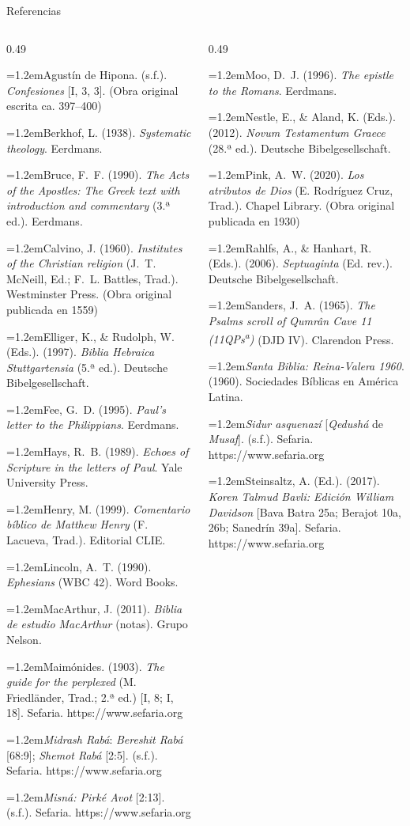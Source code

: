 \documentclass[hyperref={bookmarks=false},aspectratio=169]{beamer}
\newcommand{\refapa}[1]{\par{\RaggedRight\hangindent=1.2em\hangafter=1\noindent #1\par}\vspace{3pt}}
\begin{document}
\begin{frame}{Referencias}
\fontsize{5.1}{6.1}\selectfont
\begin{columns}[t,onlytextwidth]
\begin{column}{0.49\textwidth}
\refapa{Agustín de Hipona. (s.f.). \emph{Confesiones} [I, 3, 3]. (Obra original escrita ca. 397--400)}
\refapa{Berkhof, L. (1938). \emph{Systematic theology}. Eerdmans.}
\refapa{Bruce, F.~F. (1990). \emph{The Acts of the Apostles: The Greek text with introduction and commentary} (3.ª ed.). Eerdmans.}
\refapa{Calvino, J. (1960). \emph{Institutes of the Christian religion} (J.~T. McNeill, Ed.; F.~L. Battles, Trad.). Westminster Press. (Obra original publicada en 1559)}
\refapa{Elliger, K., \& Rudolph, W. (Eds.). (1997). \emph{Biblia Hebraica Stuttgartensia} (5.ª ed.). Deutsche Bibelgesellschaft.}
\refapa{Fee, G.~D. (1995). \emph{Paul's letter to the Philippians}. Eerdmans.}
\refapa{Hays, R.~B. (1989). \emph{Echoes of Scripture in the letters of Paul}. Yale University Press.}
\refapa{Henry, M. (1999). \emph{Comentario bíblico de Matthew Henry} (F. Lacueva, Trad.). Editorial CLIE.}
\refapa{Lincoln, A.~T. (1990). \emph{Ephesians} (WBC 42). Word Books.}
\refapa{MacArthur, J. (2011). \emph{Biblia de estudio MacArthur} (notas). Grupo Nelson.}
\refapa{Maimónides. (1903). \emph{The guide for the perplexed} (M. Friedländer, Trad.; 2.ª ed.) [I, 8; I, 18]. Sefaria. https://www.sefaria.org}
\refapa{\emph{Midrash Rabá}: \emph{Bereshit Rabá} [68:9]; \emph{Shemot Rabá} [2:5]. (s.f.). Sefaria. https://www.sefaria.org}
\refapa{\emph{Misná: Pirké Avot} [2:13]. (s.f.). Sefaria. https://www.sefaria.org}
\end{column}
\begin{column}{0.49\textwidth}
\refapa{Moo, D.~J. (1996). \emph{The epistle to the Romans}. Eerdmans.}
\refapa{Nestle, E., \& Aland, K. (Eds.). (2012). \emph{Novum Testamentum Graece} (28.ª ed.). Deutsche Bibelgesellschaft.}
\refapa{Pink, A.~W. (2020). \emph{Los atributos de Dios} (E. Rodríguez Cruz, Trad.). Chapel Library. (Obra original publicada en 1930)}
\refapa{Rahlfs, A., \& Hanhart, R. (Eds.). (2006). \emph{Septuaginta} (Ed. rev.). Deutsche Bibelgesellschaft.}
\refapa{Sanders, J.~A. (1965). \emph{The Psalms scroll of Qumrân Cave 11 (11QPs\textsuperscript{a})} (DJD IV). Clarendon Press.}
\refapa{\emph{Santa Biblia: Reina-Valera 1960}. (1960). Sociedades Bíblicas en América Latina.}
\refapa{\emph{Sidur asquenazí} [\emph{Qedushá} de \emph{Musaf}]. (s.f.). Sefaria. https://www.sefaria.org}
\refapa{Steinsaltz, A. (Ed.). (2017). \emph{Koren Talmud Bavli: Edición William Davidson} [Bava Batra 25a; Berajot 10a, 26b; Sanedrín 39a]. Sefaria. https://www.sefaria.org}

\end{column}
\end{columns}
\end{frame}
\end{document}
